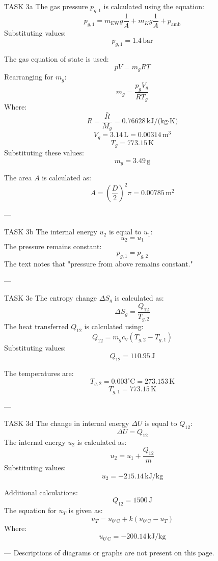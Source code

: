 TASK 3a  
The gas pressure \( p_{g,1} \) is calculated using the equation:  
\[
p_{g,1} = m_{\text{EW}} g \frac{1}{A} + m_K g \frac{1}{A} + p_{\text{amb}}
\]  
Substituting values:  
\[
p_{g,1} = 1.4 \, \text{bar}
\]  

The gas equation of state is used:  
\[
p V = m_g R T
\]  
Rearranging for \( m_g \):  
\[
m_g = \frac{p_g V_g}{R T_g}
\]  
Where:  
\[
R = \frac{\bar{R}}{M_g} = 0.76628 \, \text{kJ/(kg·K)}
\]  
\[
V_g = 3.14 \, \text{L} = 0.00314 \, \text{m}^3
\]  
\[
T_g = 773.15 \, \text{K}
\]  
Substituting these values:  
\[
m_g = 3.49 \, \text{g}
\]  

The area \( A \) is calculated as:  
\[
A = \left( \frac{D}{2} \right)^2 \pi = 0.00785 \, \text{m}^2
\]  

---

TASK 3b  
The internal energy \( u_2 \) is equal to \( u_1 \):  
\[
u_2 = u_1
\]  
The pressure remains constant:  
\[
p_{g,1} = p_{g,2}
\]  
The text notes that "pressure from above remains constant."  

---

TASK 3c  
The entropy change \( \Delta S_g \) is calculated as:  
\[
\Delta S_g = \frac{Q_{12}}{T_{g,2}}
\]  
The heat transferred \( Q_{12} \) is calculated using:  
\[
Q_{12} = m_g c_V (T_{g,2} - T_{g,1})
\]  
Substituting values:  
\[
Q_{12} = 110.95 \, \text{J}
\]  

The temperatures are:  
\[
T_{g,2} = 0.003^\circ \text{C} = 273.153 \, \text{K}
\]  
\[
T_{g,1} = 773.15 \, \text{K}
\]  

---

TASK 3d  
The change in internal energy \( \Delta U \) is equal to \( Q_{12} \):  
\[
\Delta U = Q_{12}
\]  
The internal energy \( u_2 \) is calculated as:  
\[
u_2 = u_1 + \frac{Q_{12}}{m}
\]  
Substituting values:  
\[
u_2 = -215.14 \, \text{kJ/kg}
\]  

Additional calculations:  
\[
Q_{12} = 1500 \, \text{J}
\]  
The equation for \( u_{T} \) is given as:  
\[
u_{T} = u_{0^\circ \text{C}} + k (u_{0^\circ \text{C}} - u_{T})
\]  
Where:  
\[
u_{0^\circ \text{C}} = -200.14 \, \text{kJ/kg}
\]  

---  
Descriptions of diagrams or graphs are not present on this page.